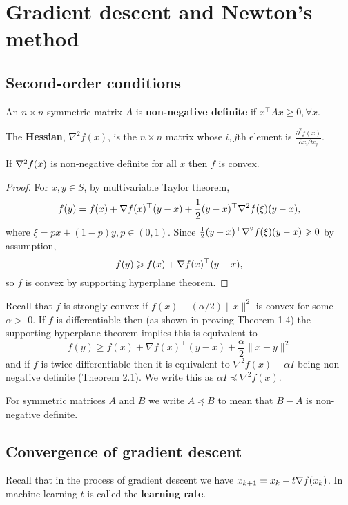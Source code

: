 \section{Gradient descent and Newton's method}
\subsection{Second-order conditions}
\begin{definition}
    An $n\times n$ symmetric matrix $A$ is \textbf{non-negative definite} if $ x^\top A x\ge 0, \forall x $.

    The \textbf{Hessian}, $ \nabla^2 f(x) $, is the $n\times n$ matrix whose $i,j$th element is $\displaystyle \frac{\partial^2 f(x)}{\partial x_i \partial x_j} $.
\end{definition}

\begin{theorem}
    If $ \nabla^2 f(x) $ is non-negative definite for all $x$ then $f$ is convex. 
\end{theorem}
\begin{proof}
    For $x,y\in S$, by multivariable Taylor theorem, 
    \[
        f(y) = f(x) + \nabla f(x) ^\top (y-x) + \frac{1}{2}(y-x)^\top \nabla^2f(\xi) (y-x), 
    \]
    where $ \xi = px + (1-p)y, p\in (0,1) $. Since $ \frac{1}{2}(y-x)^\top \nabla^2f(\xi)(y-x) \geqslant 0$ by assumption, 
    \[
        f(y) \geqslant f(x) + \nabla f(x)^\top (y-x),
    \]
    so $f$ is convex by supporting hyperplane theorem. 
\end{proof}

Recall that $f$ is strongly convex if $f(x)-(\alpha / 2)\|x\|^2$ is convex for some $\alpha>$ 0. If $f$ is differentiable then (as shown in proving Theorem 1.4) the supporting hyperplane theorem implies this is equivalent to
\[
f(y) \geq f(x)+\nabla f(x)^{\top}(y-x)+\frac{\alpha}{2}\|x-y\|^2
\]
and if $f$ is twice differentiable then it is equivalent to $\nabla^2 f(x)-\alpha I$ being non-negative definite (Theorem 2.1). We write this as $\alpha I \preceq \nabla^2 f(x)$.

\begin{definition}
    For symmetric matrices $A$ and $B$ we write $A \preceq B$ to mean that $B-A$ is non-negative definite.
\end{definition}

\subsection{Convergence of gradient descent}
Recall that in the process of gradient descent we have $ x_{k+1} = x_k - t \nabla f(x_k) $. In machine learning $t$ is called the \textbf{learning rate}. 

